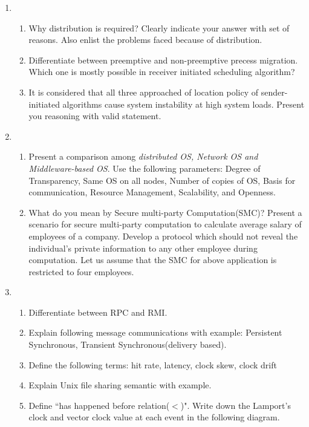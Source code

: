 \documentclass{exmppr}
\begin{document}
\begin{enumerate}

\item \begin{enumerate}
\item Why distribution is required? Clearly indicate your answer with set of reasons. Also enlist the problems faced because of distribution.

\item Differentiate between preemptive and non-preemptive precess migration. Which one is mostly possible in receiver initiated scheduling algorithm?

\item It is considered that all three approached of location policy of sender-initiated algorithms cause system instability at high system loads. Present you reasoning with valid statement.
\end{enumerate}
\item \begin{enumerate}
\item Present a comparison among \textit{distributed OS, Network OS and Middleware-based OS}. Use the following parameters: Degree of Transparency, Same OS on all nodes, Number of copies of OS, Basis for communication, Resource Management, Scalability, and Openness.

\item What do you mean by Secure multi-party Computation(SMC)? Present a scenario for secure multi-party computation to calculate average salary of employees of a company. Develop a protocol which should not reveal the individual's private information to any other employee during computation. Let us assume that the SMC for above application is restricted to four employees.
\end{enumerate}
\item \begin{enumerate}
\item Differentiate between RPC and RMI.

\item Explain following message communications with example: Persistent Synchronous, Transient Synchronous(delivery based).

\item Define the following terms: hit rate, latency, clock skew, clock drift

\item Explain Unix file sharing semantic with example.

\item Define ``has happened before relation($<$)". Write down the Lamport's clock and vector clock value at each event in the following diagram.
\end{enumerate}
\end{enumerate}
\end{document}
